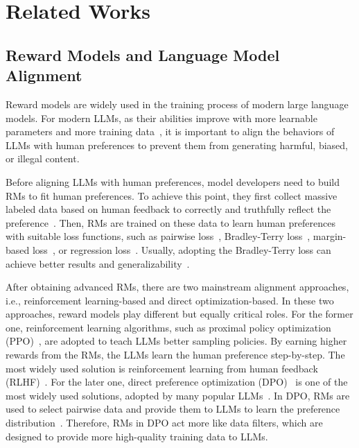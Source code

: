 \section{Related Works}
\label{sec:rw}

\subsection{Reward Models and Language Model Alignment}

Reward models are widely used in the training process of modern large language models. For modern LLMs, as their abilities improve with more learnable parameters and more training data~\cite{kaplan_scaling_2020,hoffmann_training_2022}, it is important to align the behaviors of LLMs with human preferences to prevent them from generating harmful, biased, or illegal content. 

Before aligning LLMs with human preferences, model developers need to build RMs to fit human preferences. To achieve this point, they first collect massive labeled data based on human feedback to correctly and truthfully reflect the preference~\cite{ouyang_training_2022}. Then, RMs are trained on these data to learn human preferences with suitable loss functions, such as pairwise loss~\cite{wang_helpsteer2-preference_2024}, Bradley-Terry loss~\cite{ouyang_training_2022,liu_skywork-reward_2024,wang_helpsteer2-preference_2024}, margin-based loss~\cite{liu_skywork-reward_2024}, or regression loss~\cite{wang_helpsteer2_2024}. Usually, adopting the Bradley-Terry loss can achieve better results and generalizability~\cite{liu_skywork-reward_2024,wang_helpsteer2-preference_2024}.


After obtaining advanced RMs, there are two mainstream alignment approaches, i.e., reinforcement learning-based and direct optimization-based. In these two approaches, reward models play different but equally critical roles. For the former one, reinforcement learning algorithms, such as proximal policy optimization (PPO)~\cite{schulman_proximal_2017}, are adopted to teach LLMs better sampling policies. By earning higher rewards from the RMs, the LLMs learn the human preference step-by-step. The most widely used solution is reinforcement learning from human feedback (RLHF)~\cite{ouyang_training_2022}.  For the later one, direct preference optimization (DPO)~\cite{rafailov_direct_2023} is one of the most widely used solutions, adopted by many popular LLMs~\cite{touvron_llama_2023-1,yang_qwen2_2024,dubey_llama_2024}. In DPO, RMs are used to select pairwise data and provide them to LLMs to learn the preference distribution~\cite{touvron_llama_2023-1,dubey_llama_2024}. Therefore, RMs in DPO act more like data filters, which are designed to provide more high-quality training data to LLMs.


